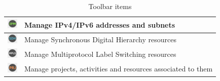 \documentclass[a4paper]{article}
\begin{document}
\begin{table}[h!]
\begin{tabular}{cl}
			\midrule
			\includegraphics[width=0.5cm]{img/icon_IPAM_manager.png} & Manage IPv4/IPv6 addresses and subnets\\
			\midrule
			\includegraphics[width=0.5cm]{img/icon_SDH_networks.png} & Manage Synchronous Digital Hierarchy resources\\
			\midrule
			\includegraphics[width=0.5cm]{img/icon_MPLS_mudule.png} & Manage Multiprotocol Label Switching resources\\
			\midrule
			\includegraphics[width=0.5cm]{img/icon_projects.png} & Manage projects, activities and resources associated to them\\
		\end{tabular}	
		\caption{Toolbar items}
		\label{tab:toolbar_icons}
	\end{table}
		
	\clearpage
\end{document}
